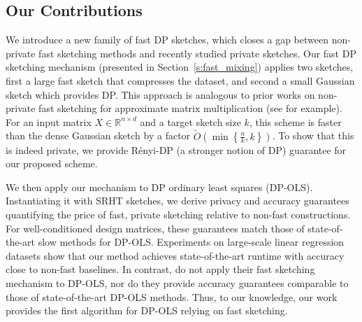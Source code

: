 \documentclass[11pt]{article}
\theoremstyle{definition}
\theoremstyle{plain}
\providecommand{\sectionref}[1]{Section~\ref{#1}}
\newcommand{\reals}{\mathbb{R}}
\newcommand{\DP}{{\normalfont DP}~}
\newcommand{\Renyi}{{\normalfont R\'enyi}~}
\newcommand{\RenyiDP}{{\normalfont \Renyi\hspace{-.3em}-\DP}~}
\begin{document}
\subsection{Our Contributions}
\label{s:intro_contrib}

We introduce a new family of fast DP sketches, which closes a gap between non-private fast sketching methods and recently studied private sketches.
Our fast DP sketching mechanism (presented in \sectionref{s:fast_mixing}) applies two sketches, first a large fast sketch that compresses the dataset, and second a small Gaussian sketch which provides DP.
This approach is analogous to prior works on non-private fast sketching for approximate matrix multiplication (see \citet[Appendix~A.3]{cohen2016optimal_amm} for example).
For an input matrix \(X \in \reals^{n \times d}\) and a target sketch size \(k\), this scheme is faster than the dense Gaussian sketch by a factor 
\(\widetilde{O}\left(\min\left\{\frac{n}{k}, k\right\}\right)\).
To show that this is indeed private, we provide R\'{e}nyi-DP (a stronger notion of DP) guarantee for our proposed scheme.

We then apply our mechanism to DP ordinary least squares (DP-OLS). Instantiating it with SRHT sketches, we derive privacy and accuracy guarantees quantifying the price of fast, private sketching relative to non-fast constructions. For well-conditioned design matrices, these guarantees match those of state-of-the-art slow methods for DP-OLS. Experiments on large-scale linear regression datasets show that our method achieves state-of-the-art runtime with accuracy close to non-fast baselines. In contrast, \citet{upadhyay2014randomness} do not apply their fast sketching mechanism to DP-OLS, nor do they provide accuracy guarantees comparable to those of state-of-the-art DP-OLS methods. Thus, to our knowledge, our work provides the first algorithm for DP-OLS relying on fast sketching.
\end{document}
